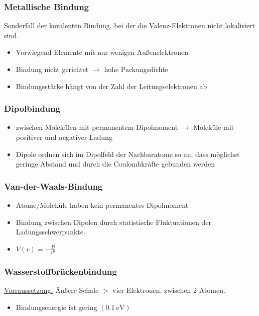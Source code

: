 \begin{sectionbox}
    \subsubsection{Metallische Bindung}
    Sonderfall der kovalenten Bindung, bei der die Valenz-Elektronen nicht lokalisiert sind.
    \begin{itemize}
        \item Vorwiegend Elemente mit nur wenigen Außenelektronen
        \item Bindung nicht gerichtet $\rightarrow$ hohe Packungsdichte
        \item Bindungsstärke hängt von der Zahl der Leitungselektronen ab
    \end{itemize}

    \subsubsection{Dipolbindung}
    \begin{itemize}
        \item zwischen Molekülen mit permanentem Dipolmoment $\rightarrow$ Moleküle mit positiver und negativer Ladung
        \item Dipole ordnen sich im Dipolfeld der Nachbaratome so an, dass möglichst geringe Abstand und durch die Coulombkräfte gebunden werden
    \end{itemize}

    \subsubsection{Van-der-Waals-Bindung}
    \begin{itemize}
        \item Atome/Moleküle haben kein permanentes Dipolmoment
        \item Bindung zwischen Dipolen durch statistische Fluktuationen der Ladungsschwerpunkte.
        \item $V(r) = -\frac{B}{r^6}$
    \end{itemize}
    \subsubsection{Wasserstoffbrückenbindung}
    \underline{Vorraussetzung:} Äußere Schale $>$ vier Elektronen, zwischen 2 Atomen.
    \begin{itemize}
        \item Bindungsenergie ist gering $(\SI{0,1}{\electronvolt})$
    \end{itemize}
\end{sectionbox}


